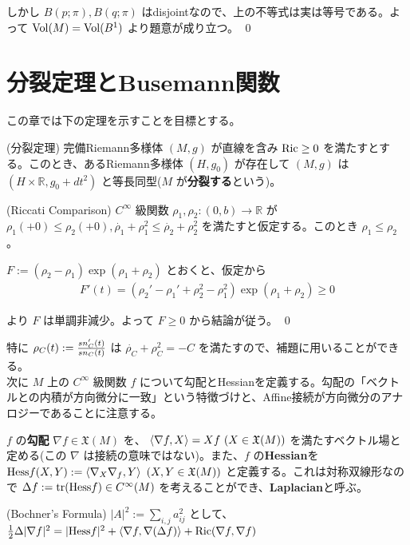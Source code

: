 \documentclass[dvipdfmx,a4paper]{jsreport}
\theoremstyle{definition}
\newcommand{\Vol}{{\rm Vol}}
\newcommand{\Ric}{{\rm Ric}}
\newcommand{\Hess}{{\rm Hess}}
\newcommand{\R}{\mathbb{R}}
\begin{document}
しかし $B(p;{\pi}),B(q;{\pi})$ はdisjointなので、上の不等式は実は等号である。よって $\Vol(M)=\Vol(B^1)$ より題意が成り立つ。 \qed


\section{分裂定理とBusemann関数}

この章では下の定理を示すことを目標とする。


\thm\label{thmsplit} (分裂定理) 完備Riemann多様体 $(M,g)$ が直線を含み $\Ric \geq 0$ を満たすとする。このとき、あるRiemann多様体 $(H,g_0)$ が存在して $(M,g)$ は $(H \times \R,g_0+dt^2)$ と等長同型($M$ が\textbf{分裂する}という)。

\lem (Riccati Comparison) $C^\infty$ 級関数 $\rho_1,\rho_2:(0,b) \to \R$ が $\rho_1(+0) \leq \rho_2(+0),\dot{\rho_1}+\rho_1^2 \leq \dot{\rho_2}+\rho_2^2$ を満たすと仮定する。このとき $\rho_1 \leq \rho_2$ 。

\prf $F:=(\rho_2-\rho_1)\exp(\rho_1+\rho_2)$ とおくと、仮定から
\begin{align*}
    F'(t) = (\rho_2'-\rho_1'+\rho_2^2-\rho_1^2)\exp(\rho_1+\rho_2) \geq 0    
\end{align*}

より $F$ は単調非減少。よって $F \geq 0$ から結論が従う。 \qed

特に $\rho_C(t):={sn_C'(t) \over sn_C(t)}$ は $\dot{\rho_C}+\rho_C^2=-C$ を満たすので、補題に用いることができる。\\

次に $M$ 上の $C^\infty$ 級関数 $f$ について勾配とHessianを定義する。勾配の「ベクトルとの内積が方向微分に一致」という特徴づけと、Affine接続が方向微分のアナロジーであることに注意する。

 $f$ の\textbf{勾配} $\nabla f \in \mathfrak{X}(M)$ を、 $\ev{\nabla f,X}=Xf\ (X \in \mathfrak{X}(M))$ を満たすベクトル場と定める(この $\nabla$ は接続の意味ではない)。また、$f$ の\textbf{Hessian}を $\mbox{Hess}f(X,Y):=\ev{\nabla_X \nabla_f,Y}\ (X,Y \in \mathfrak{X}(M))$ と定義する。これは対称双線形なので $\Delta f:=\tr(\mbox{Hess}f) \in C^\infty(M)$ を考えることができ、\textbf{Laplacian}と呼ぶ。

\prop (Bochner's Formula) $|A|^2:=\sum_{i,j}a_{ij}^2$ として、 ${1 \over 2}\Delta|\nabla f|^2=|\Hess f|^2+\ev{\nabla f,\nabla(\Delta f)}+\Ric(\nabla f,\nabla f)$
\end{document}
